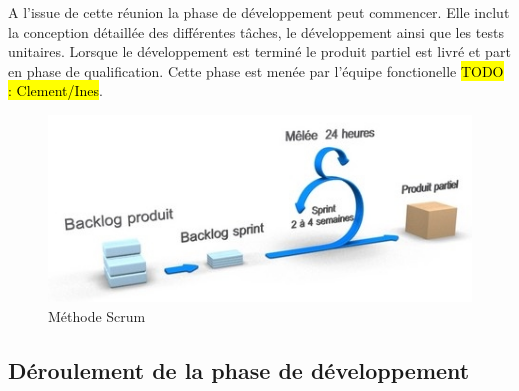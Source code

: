 	A l'issue de cette réunion la phase de développement peut commencer. Elle inclut la conception détaillée des différentes tâches, le développement ainsi que les tests unitaires. Lorsque le développement est terminé le produit partiel est livré et part en phase de qualification. Cette phase est menée par l'équipe fonctionelle \hl{TODO : Clement/Ines}.

\begin{figure}[h!]
	\includegraphics[scale=0.7]{images/travailBP1818/scrum.jpg}
	\centering
	\caption{Méthode Scrum}
	\label{scrum}
\end{figure}

\subsection{Déroulement de la phase de développement}